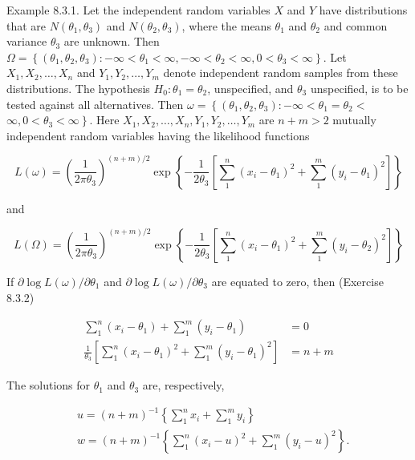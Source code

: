 Example 8.3.1. Let the independent random variables $X$ and $Y$ have distributions that are $N\left(\theta_{1}, \theta_{3}\right)$ and $N\left(\theta_{2}, \theta_{3}\right)$, where the means $\theta_{1}$ and $\theta_{2}$ and common variance $\theta_{3}$ are unknown. Then $\Omega=\left\{\left(\theta_{1}, \theta_{2}, \theta_{3}\right):-\infty<\theta_{1}<\infty,-\infty<\theta_{2}<\infty, 0<\theta_{3}<\infty\right\}$. Let $X_{1}, X_{2}, \ldots, X_{n}$ and $Y_{1}, Y_{2}, \ldots, Y_{m}$ denote independent random samples from these distributions. The hypothesis $H_{0}: \theta_{1}=\theta_{2}$, unspecified, and $\theta_{3}$ unspecified, is to be tested against all alternatives. Then $\omega=\left\{\left(\theta_{1}, \theta_{2}, \theta_{3}\right):-\infty<\theta_{1}=\theta_{2}<\right.$ $\left.\infty, 0<\theta_{3}<\infty\right\}$. Here $X_{1}, X_{2}, \ldots, X_{n}, Y_{1}, Y_{2}, \ldots, Y_{m}$ are $n+m>2$ mutually\\
independent random variables having the likelihood functions

$$
L(\omega)=\left(\frac{1}{2 \pi \theta_{3}}\right)^{(n+m) / 2} \exp \left\{-\frac{1}{2 \theta_{3}}\left[\sum_{1}^{n}\left(x_{i}-\theta_{1}\right)^{2}+\sum_{1}^{m}\left(y_{i}-\theta_{1}\right)^{2}\right]\right\}
$$

and

$$
L(\Omega)=\left(\frac{1}{2 \pi \theta_{3}}\right)^{(n+m) / 2} \exp \left\{-\frac{1}{2 \theta_{3}}\left[\sum_{1}^{n}\left(x_{i}-\theta_{1}\right)^{2}+\sum_{1}^{m}\left(y_{i}-\theta_{2}\right)^{2}\right]\right\}
$$

If $\partial \log L(\omega) / \partial \theta_{1}$ and $\partial \log L(\omega) / \partial \theta_{3}$ are equated to zero, then (Exercise 8.3.2)


\begin{align*}
\sum_{1}^{n}\left(x_{i}-\theta_{1}\right)+\sum_{1}^{m}\left(y_{i}-\theta_{1}\right) & =0 \\
\frac{1}{\theta_{3}}\left[\sum_{1}^{n}\left(x_{i}-\theta_{1}\right)^{2}+\sum_{1}^{m}\left(y_{i}-\theta_{1}\right)^{2}\right] & =n+m \tag{8.3.2}
\end{align*}


The solutions for $\theta_{1}$ and $\theta_{3}$ are, respectively,

$$
\begin{aligned}
& u=(n+m)^{-1}\left\{\sum_{1}^{n} x_{i}+\sum_{1}^{m} y_{i}\right\} \\
& w=(n+m)^{-1}\left\{\sum_{1}^{n}\left(x_{i}-u\right)^{2}+\sum_{1}^{m}\left(y_{i}-u\right)^{2}\right\} .
\end{aligned}
$$

